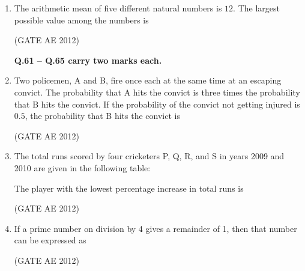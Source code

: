 \documentclass[journal,12pt,onecolumn]{IEEEtran}
\theoremstyle{remark}
\begin{document}
\begin{enumerate}
\item The arithmetic mean of five different natural numbers is $12$. The largest possible value among the numbers is
\begin{enumerate}
\end{enumerate}
\hfill(GATE AE 2012)



\textbf{Q.61 -- Q.65 carry two marks each.}

\item Two policemen, A and B, fire once each at the same time at an escaping convict. The probability that A hits the convict is three times the probability that B hits the convict. If the probability of the convict not getting injured is $0.5$, the probability that B hits the convict is
\begin{enumerate}
\end{enumerate}
\hfill(GATE AE 2012)



\item The total runs scored by four cricketers P, Q, R, and S in years 2009 and 2010 are given in the following table: 

The player with the lowest percentage increase in total runs is 
\begin{enumerate}
\end{enumerate}
\hfill(GATE AE 2012)



\item If a prime number on division by 4 gives a remainder of 1, then that number can be expressed as  
\begin{enumerate}
    \end{enumerate}
    \hfill(GATE AE 2012)



\end{enumerate}
\end{document}
